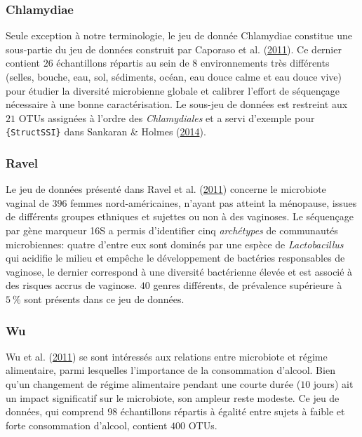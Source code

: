 \documentclass[12pt,a4paper]{reedthesis}
\theoremstyle{definition}
\theoremstyle{definition}
\theoremstyle{definition}
\theoremstyle{remark}
\begin{document}
\hypertarget{chlamydiae}{%
\subsubsection*{Chlamydiae}\label{chlamydiae}}

Seule exception à notre terminologie, le jeu de donnée Chlamydiae constitue une sous-partie du jeu de données construit par Caporaso et al. (\protect\hyperlink{ref-caporaso2011global}{2011}). Ce dernier contient \(26\) échantillons répartis au sein de \(8\) environnements très différents (selles, bouche, eau, sol, sédiments, océan, eau douce calme et eau douce vive) pour étudier la diversité microbienne globale et calibrer l'effort de séquençage nécessaire à une bonne caractérisation. Le sous-jeu de données est restreint aux \(21\) OTUs assignées à l'ordre des \emph{Chlamydiales} et a servi d'exemple pour \texttt{\{StructSSI\}} dans Sankaran \& Holmes (\protect\hyperlink{ref-sankaran2014structssi}{2014}).

\hypertarget{ravel}{%
\subsubsection*{Ravel}\label{ravel}}

Le jeu de données présenté dans Ravel et al. (\protect\hyperlink{ref-ravel2011vaginal}{2011}) concerne le microbiote vaginal de \(396\) femmes nord-américaines, n'ayant pas atteint la ménopause, issues de différents groupes ethniques et sujettes ou non à des vaginoses. Le séquençage par gène marqueur 16S a permis d'identifier cinq \emph{archétypes} de communautés microbiennes: quatre d'entre eux sont dominés par une espèce de \emph{Lactobacillus} qui acidifie le milieu et empêche le développement de bactéries responsables de vaginose, le dernier correspond à une diversité bactérienne élevée et est associé à des risques accrus de vaginose. \(40\) genres différents, de prévalence supérieure à \(5~\%\) sont présents dans ce jeu de données.

\hypertarget{wu}{%
\subsubsection*{Wu}\label{wu}}

Wu et al. (\protect\hyperlink{ref-wu2011linking}{2011}) se sont intéressés aux relations entre microbiote et régime alimentaire, parmi lesquelles l'importance de la consommation d'alcool. Bien qu'un changement de régime alimentaire pendant une courte durée (\(10\) jours) ait un impact significatif sur le microbiote, son ampleur reste modeste. Ce jeu de données, qui comprend \(98\) échantillons répartis à égalité entre sujets à faible et forte consommation d'alcool, contient \(400\) OTUs.
\end{document}
